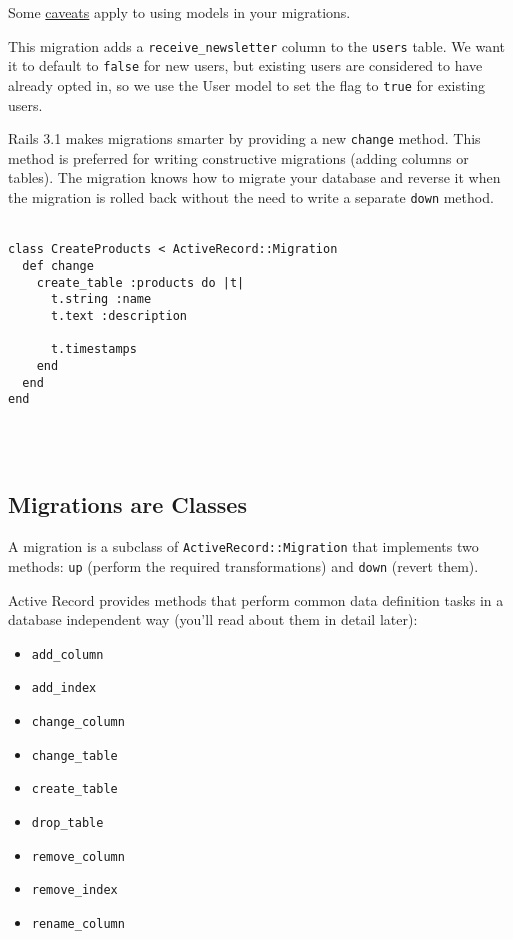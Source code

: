 \documentclass[10pt]{book}
\begin{document}
Some \hyperlink{using-models-in-your-migrations}{caveats} apply to using models in your migrations.

This migration adds a \texttt{receive\_newsletter} column to the \texttt{users} table. We want it to default to \texttt{false} for new users, but existing users are considered to have already opted in, so we use the User model to set the flag to \texttt{true} for existing users.

Rails 3.1 makes migrations smarter by providing a new \texttt{change} method. This method is preferred for writing constructive migrations (adding columns or tables). The migration knows how to migrate your database and reverse it when the migration is rolled back without the need to write a separate \texttt{down} method.
\\ \\
\begin{minipage}{\textwidth}
\begin{verbatim}
class CreateProducts < ActiveRecord::Migration
  def change
    create_table :products do |t|
      t.string :name
      t.text :description
 
      t.timestamps
    end
  end
end
\end{verbatim}
\end{minipage}
\\ \\

\subsection{ Migrations are Classes}

A migration is a subclass of \texttt{ActiveRecord::Migration} that implements two methods: \texttt{up} (perform the required transformations) and \texttt{down} (revert them).

Active Record provides methods that perform common data definition tasks in a database independent way (you’ll read about them in detail later):
\begin{itemize}
	\item \texttt{add\_column}
	\item \texttt{add\_index}
	\item \texttt{change\_column}
	\item \texttt{change\_table}
	\item \texttt{create\_table}
	\item \texttt{drop\_table}
	\item \texttt{remove\_column}
	\item \texttt{remove\_index}
	\item \texttt{rename\_column}
\end{itemize}
\end{document}
